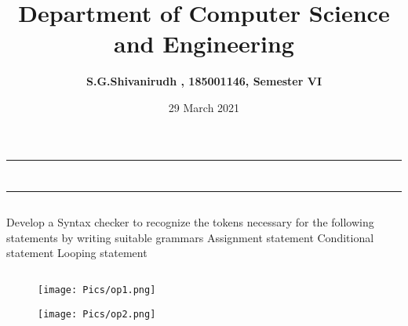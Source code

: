 \documentclass[12pt,letterpaper]{article}
\title{\textbf{Department of Computer Science and Engineering}}
\author{\textbf{S.G.Shivanirudh , 185001146, Semester VI }}
\date{29 March 2021}
\begin{document}
\maketitle
\hrule
\section*{}
\hrule 
\bigskip\bigskip

\subsection*{}

\subsection*{}
\begin{flushleft}
    Develop a Syntax checker to recognize the tokens necessary for the following statements by writing suitable grammars
    Assignment statement
    Conditional statement
    Looping statement
\end{flushleft}

\subsection*{}
\subsubsection*{}
\begin{flushleft}

\end{flushleft}
\subsubsection*{}
\begin{flushleft}

\end{flushleft}

\newpage
\subsection*{}

\subsubsection*{}
\begin{figure}[h]
    \centering
    \texttt{[image: Pics/op1.png]}
\end{figure}
\begin{figure}[h]
    \centering
    \texttt{[image: Pics/op2.png]}
\end{figure}
\end{document}
